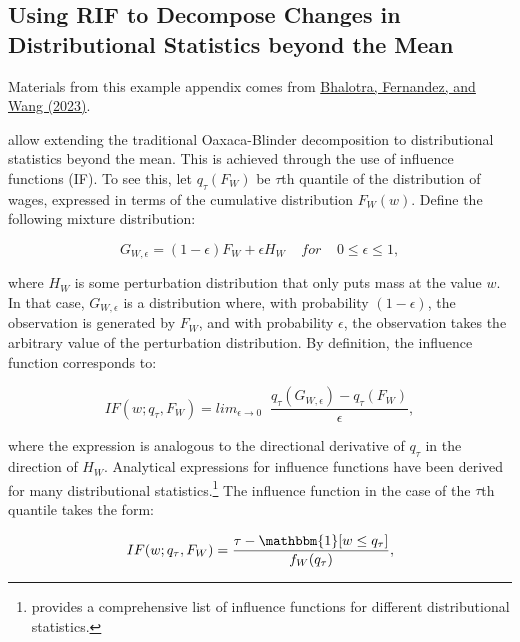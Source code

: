 \subsection{Using RIF to Decompose Changes in Distributional Statistics beyond the Mean\label{RIF}}

Materials from this example appendix comes from \href{https://fanwangecon.github.io/assets/BhalotraFernandezWangMexicoFLFP.pdf}{Bhalotra, Fernandez, and Wang (2023)}. 

\citet{Firpoetal07, Firpoetal09} allow extending the traditional Oaxaca-Blinder decomposition to distributional statistics beyond the mean. This is achieved through the use of influence functions (IF). To see this, let $q_{\tau}(F_{W})$ be $\tau$th quantile of the distribution of wages, expressed in terms of the cumulative distribution $F_{W}(w)$. Define the following mixture distribution:

\begin{equation}
\label{eq=mixture_function}
G_{W,\epsilon}=(1-\epsilon)F_{W}+\epsilon H_{W} \;\;\;\; for \;\;\;\; 0 \leq \epsilon \leq 1,
\end{equation}

\noindent where $H_{W}$ is some perturbation distribution that only puts mass at the value $w$. In that case, $G_{W,\epsilon}$ is a distribution where, with probability $(1-\epsilon)$, the observation is generated by $F_{W}$, and with probability $\epsilon$, the observation takes the arbitrary value of the perturbation distribution. By definition, the influence function corresponds to:  

\begin{equation}
IF(w;q_{\tau}, F_{W}) = lim_{\epsilon \rightarrow 0} \;\; \frac{q_{\tau}(G_{W,\epsilon})-q_{\tau}(F_{W})}{\epsilon},
\end{equation}

\noindent where the expression is analogous to the directional derivative of $q_{\tau}$ in the direction of $H_{W}$. Analytical expressions for influence functions have been derived for many distributional statistics.\footnote{\citet{Essama11} provides a comprehensive list of influence functions for different distributional statistics.} The influence function in the case of the $\tau$th quantile takes the form: 

\begin{equation}\label{eq=ifq}
IF(w; q_{\tau}, F_{W}) = \frac{\tau - \mathbbm{1}[w \leq q_{\tau}]} {f_{W}(q_{\tau})},
\end{equation}


